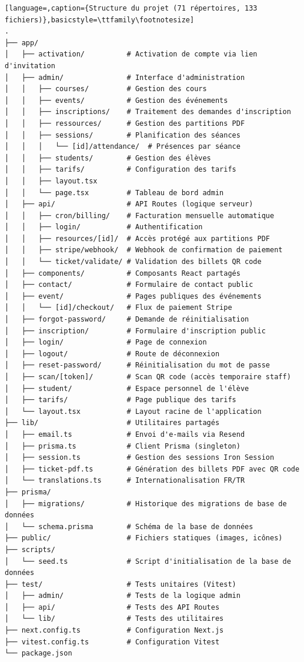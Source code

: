 \documentclass{article}
\begin{document}
\begin{lstlisting}[language=,caption={Structure du projet (71 répertoires, 133 fichiers)},basicstyle=\ttfamily\footnotesize]
.
├── app/
│   ├── activation/          # Activation de compte via lien d'invitation
│   ├── admin/               # Interface d'administration
│   │   ├── courses/         # Gestion des cours
│   │   ├── events/          # Gestion des événements
│   │   ├── inscriptions/    # Traitement des demandes d'inscription
│   │   ├── ressources/      # Gestion des partitions PDF
│   │   ├── sessions/        # Planification des séances
│   │   │   └── [id]/attendance/  # Présences par séance
│   │   ├── students/        # Gestion des élèves
│   │   ├── tarifs/          # Configuration des tarifs
│   │   ├── layout.tsx
│   │   └── page.tsx         # Tableau de bord admin
│   ├── api/                 # API Routes (logique serveur)
│   │   ├── cron/billing/    # Facturation mensuelle automatique
│   │   ├── login/           # Authentification
│   │   ├── resources/[id]/  # Accès protégé aux partitions PDF
│   │   ├── stripe/webhook/  # Webhook de confirmation de paiement
│   │   └── ticket/validate/ # Validation des billets QR code
│   ├── components/          # Composants React partagés
│   ├── contact/             # Formulaire de contact public
│   ├── event/               # Pages publiques des événements
│   │   └── [id]/checkout/   # Flux de paiement Stripe
│   ├── forgot-password/     # Demande de réinitialisation
│   ├── inscription/         # Formulaire d'inscription public
│   ├── login/               # Page de connexion
│   ├── logout/              # Route de déconnexion
│   ├── reset-password/      # Réinitialisation du mot de passe
│   ├── scan/[token]/        # Scan QR code (accès temporaire staff)
│   ├── student/             # Espace personnel de l'élève
│   ├── tarifs/              # Page publique des tarifs
│   └── layout.tsx           # Layout racine de l'application
├── lib/                     # Utilitaires partagés
│   ├── email.ts             # Envoi d'e-mails via Resend
│   ├── prisma.ts            # Client Prisma (singleton)
│   ├── session.ts           # Gestion des sessions Iron Session
│   ├── ticket-pdf.ts        # Génération des billets PDF avec QR code
│   └── translations.ts      # Internationalisation FR/TR
├── prisma/
│   ├── migrations/          # Historique des migrations de base de données
│   └── schema.prisma        # Schéma de la base de données
├── public/                  # Fichiers statiques (images, icônes)
├── scripts/
│   └── seed.ts              # Script d'initialisation de la base de données
├── test/                    # Tests unitaires (Vitest)
│   ├── admin/               # Tests de la logique admin
│   ├── api/                 # Tests des API Routes
│   └── lib/                 # Tests des utilitaires
├── next.config.ts           # Configuration Next.js
├── vitest.config.ts         # Configuration Vitest
└── package.json
\end{lstlisting}
\end{document}
